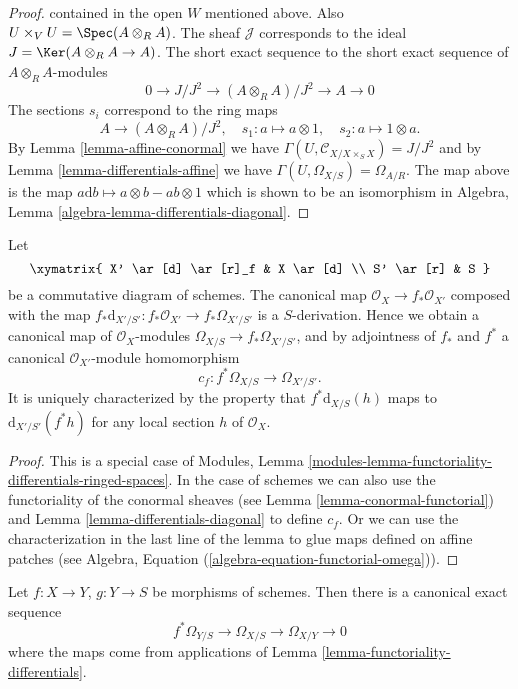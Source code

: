 \begin{proof}
contained in the open $W$ mentioned above. Also
$U \times_V U = \Spec(A \otimes_R A)$.
The sheaf $\mathcal{J}$ corresponds to the ideal
$J = \Ker(A \otimes_R A \to A)$.
The short exact sequence to the short exact sequence
of $A \otimes_R A$-modules
$$
0 \to J/J^2 \to (A \otimes_R A)/J^2 \to A \to 0
$$
The sections $s_i$ correspond to the ring maps
$$
A \longrightarrow (A \otimes_R A)/J^2,\quad
s_1 : a \mapsto a \otimes 1,\quad
s_2 : a \mapsto 1 \otimes a.
$$
By Lemma \ref{lemma-affine-conormal} we have
$\Gamma(U, \mathcal{C}_{X/X \times_S X}) = J/J^2$ and
by Lemma \ref{lemma-differentials-affine}
we have $\Gamma(U, \Omega_{X/S}) = \Omega_{A/R}$.
The map above is the map $a \text{d}b \mapsto a \otimes b - ab \otimes 1$
which is shown to be an isomorphism in
Algebra, Lemma \ref{algebra-lemma-differentials-diagonal}.
\end{proof}

\begin{lemma}
\label{lemma-functoriality-differentials}
Let
$$
\xymatrix{
X' \ar[d] \ar[r]_f & X \ar[d] \\
S' \ar[r] & S
}
$$
be a commutative diagram of schemes. The canonical map
$\mathcal{O}_X \to f_*\mathcal{O}_{X'}$ composed with the map
$f_*\text{d}_{X'/S'} : f_*\mathcal{O}_{X'} \to f_*\Omega_{X'/S'}$ is a
$S$-derivation. Hence we obtain a canonical map of $\mathcal{O}_X$-modules
$\Omega_{X/S} \to f_*\Omega_{X'/S'}$, and by
adjointness of $f_*$ and $f^*$ a
canonical $\mathcal{O}_{X'}$-module homomorphism
$$
c_f : f^*\Omega_{X/S} \longrightarrow \Omega_{X'/S'}.
$$
It is uniquely characterized by the property that
$f^*\text{d}_{X/S}(h)$ maps to $\text{d}_{X'/S'}(f^* h)$
for any local section $h$ of $\mathcal{O}_X$.
\end{lemma}

\begin{proof}
This is a special case of
Modules, Lemma \ref{modules-lemma-functoriality-differentials-ringed-spaces}.
In the case of schemes we can also use the functoriality of
the conormal sheaves (see Lemma \ref{lemma-conormal-functorial}) and
Lemma \ref{lemma-differentials-diagonal} to define $c_f$.
Or we can use the characterization in the last line of the lemma to
glue maps defined on affine patches
(see Algebra, Equation (\ref{algebra-equation-functorial-omega})).
\end{proof}

\begin{lemma}
\label{lemma-triangle-differentials}
Let $f : X \to Y$, $g : Y \to S$ be morphisms of schemes.
Then there is a canonical exact sequence
$$
f^*\Omega_{Y/S} \to \Omega_{X/S} \to \Omega_{X/Y} \to 0
$$
where the maps come from applications of
Lemma \ref{lemma-functoriality-differentials}.
\end{lemma}

